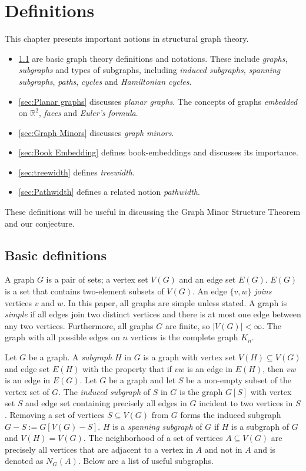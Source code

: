 \chapter{Definitions}\label{chap:Definitions}
This chapter presents important notions in structural graph theory.
\begin{itemize}
	\item \cref{sec: Basic definitions} are basic graph theory definitions and notations. These include \textit{graphs}, \textit{subgraphs} and types of subgraphs, including \textit{induced subgraphs,} \textit{spanning subgraphs}, \textit{paths}, \textit{cycles} and \textit{Hamiltonian cycles}. 
	\item \cref{sec:Planar graphs} discusses \textit{planar graphs}. The concepts of graphs \textit{embedded} on $\mathbb{R}^2$, \textit{faces} and \textit{Euler's formula}.
	\item \cref{sec:Graph Minors} discusses \textit{graph minors}.
	\item \cref{sec:Book Embedding} defines book-embeddings and discusses its importance.
	\item \cref{sec:treewidth} defines \textit{treewidth}.
	\item \cref{sec:Pathwidth} defines a related notion \textit{pathwidth}.
\end{itemize}
These definitions will be useful in discussing the Graph Minor Structure Theorem and our conjecture.
\section{Basic definitions}\label{sec: Basic definitions}
A graph $G$ is a pair of sets; a vertex set $V(G)$ and an edge set $E(G)$. $E(G)$ is a set that contains two-element subsets of $V(G)$. An edge $ \{v, w\}$ \textit{joins} vertices $v$ and $w$. In this paper, all graphs are simple unless stated. A graph is \textit{simple} if all edges join two distinct vertices and there is at most one edge between any two vertices. Furthermore, all graphs $G$ are finite, so $|V(G)| < \infty$. The graph with all possible edges on $n$ vertices is the complete graph $K_n$.

Let $G$ be a graph. A \textit{subgraph} $H$ in $G$ is a graph with vertex set $V(H) \subseteq V(G)$ and edge set $E(H)$ with the property that if $vw$ is an edge in $E(H)$, then $vw$ is an edge in $E(G)$.
Let $G$ be a graph and let $S$ be a non-empty subset of the vertex set of $G$. The \textit{induced subgraph} of $S$ in $G$ is the graph $G[S]$ with vertex set $S$ and edge set containing precisely all edges in $G$ incident to two vertices in $S$. Removing a set of vertices $S \subseteq V(G)$ from $G$ forms the induced subgraph $G - S := G[V(G) - S]$. 
$H$ is a \textit{spanning subgraph} of $G$ if $H$ is a subgraph of $G$ and $V(H) = V(G)$. 
The neighborhood of a set of vertices $A \subseteq V(G)$ are precisely all vertices that are adjacent to a vertex in $A$ and not in $A$ and is denoted as $N_G(A)$. Below are a list of useful subgraphs.

